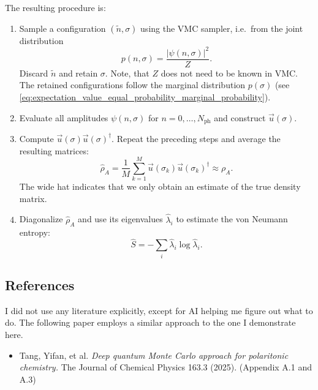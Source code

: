 \documentclass[../../main.tex]{subfiles}
\begin{document}
The resulting procedure is:
\begin{enumerate}
\item Sample a configuration $(\tilde n,\sigma)$ using the VMC sampler,
      i.e.\ from the joint distribution
      \begin{equation}
      p(n,\sigma)=\frac{|\psi(n,\sigma)|^2}{Z}.
      \end{equation}
      Discard $\tilde n$ and retain $\sigma$. Note, that $Z$ does not need to be known in VMC. The retained configurations follow the marginal distribution $p(\sigma)$ (see \cref{eq:expectation_value_equal_probability_marginal_probability}).
\item Evaluate all amplitudes $\psi(n,\sigma)$ for
      $n=0,\dots,N_{\mathrm{ph}}$ and construct $\vec u(\sigma)$.
\item Compute $\vec u(\sigma)\vec u(\sigma)^\dagger$.
      Repeat the preceding steps and average the resulting matrices:
      \begin{equation}
      \widehat\rho_A=
      \frac{1}{M}\sum_{k=1}^{M}
      \vec u(\sigma_k)\vec u(\sigma_k)^\dagger
      \approx\rho_A.
      \end{equation}
      The wide hat indicates that we only obtain an estimate of the true density matrix.
\item Diagonalize $\widehat\rho_A$ and use its eigenvalues
      $\widehat\lambda_i$ to estimate the von Neumann entropy:
      \begin{equation}
      \widehat S=-\sum_i\widehat\lambda_i\log\widehat\lambda_i.
      \end{equation}
\end{enumerate}

\subsection{References}
I did not use any literature explicitly, except for AI helping me figure out what to do. The following paper employs a similar approach to the one I demonstrate here.
\begin{itemize}
\item Tang, Yifan, et al. \emph{Deep quantum Monte Carlo approach for polaritonic chemistry.} The Journal of Chemical Physics 163.3 (2025). (Appendix A.1 and A.3)
\end{itemize}
\end{document}
